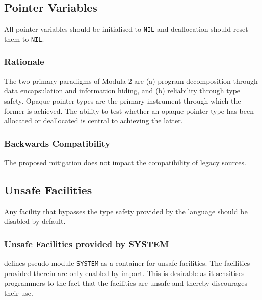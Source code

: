 \documentclass[10pt,a4paper]{article}
\begin{document}
\subsection{Pointer Variables}
All pointer variables should be initialised to \verb|NIL| and deallocation
should reset them to \verb|NIL|.

\subsubsection{Rationale}
The two primary paradigms of Modula-2 are (a) program decomposition through
data encapsulation and information hiding, and (b) reliability through type
safety. Opaque pointer types are the primary instrument through which the
former is achieved. The ability to test whether an opaque pointer type has
been allocated or deallocated is central to achieving the latter.

\subsubsection{Backwards Compatibility}

The proposed mitigation does not impact the compatibility of legacy sources.


\subsection{Unsafe Facilities}

Any facility that bypasses the type safety provided by the language should be
disabled by default.

\subsubsection{Unsafe Facilities provided by SYSTEM}
\cite[p.121]{Wirth88} defines pseudo-module \verb|SYSTEM| as a container for
unsafe facilities. The facilities provided therein are only enabled by import.
This is desirable as it sensitises programmers to the fact that the facilities
are unsafe and thereby discourages their use.
 
\end{document}
